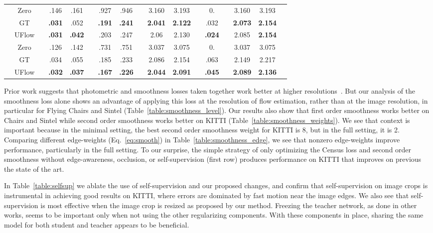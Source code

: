 \documentclass[runningheads]{llncs}
\begin{document}
\begin{wraptable}{r}{0.45\columnwidth}
{\begin{tabular}{lcccccccccccccccc}
    \midrule
    \parbox[t]{2mm}{}
    & Zero && .146 & .161 && .927 & .946 && 3.160 & 3.193 && 0. && 3.160 & 3.193 \\
    & GT && \textbf{.031} & .052 && \textbf{.191} & \textbf{.241} && \textbf{2.041} & \textbf{2.122} && .032 && \textbf{2.073} & \textbf{2.154} \\
    & UFlow && \textbf{.031} & \textbf{.042} && .203 & .247 && 2.06 & 2.130 && \textbf{.024} && 2.085 & \textbf{2.154} \\
    \midrule
    \parbox[t]{2mm}{}
    & Zero && .126 & .142 && .731 & .751 && 3.037 & 3.075 && 0. && 3.037 & 3.075 \\
    & GT && .034 & .055 && .185 & .233 && 2.086 & 2.154 && .063 && 2.149 & 2.217 \\
    & UFlow && \textbf{.032} & \textbf{.037} && \textbf{.167} & \textbf{.226} && \textbf{2.044} & \textbf{2.091} && \textbf{.045} && \textbf{2.089} & \textbf{2.136} \\
    \bottomrule
    \end{tabular}}
    \vspace{-0.2cm}
\end{wraptable}

 Prior work suggests that photometric and smoothness losses taken together work better at higher resolutions~\cite{godard2019digging}. But our analysis of the smoothness loss alone shows an advantage of applying this loss at the resolution of flow estimation, rather than at the image resolution, in particular for Flying Chairs and Sintel (Table~\ref{table:smoothness_level}). Our results also show that first order smoothness works better on Chairs and Sintel while second order smoothness works better on KITTI (Table~\ref{table:smoothness_weights}). We see that context is important because in the minimal setting, the best second order smoothness weight for KITTI is 8, but in the full setting, it is 2. Comparing different edge-weights  (Eq.~\ref{eq:smooth}) in Table~\ref{table:smoothness_edge}, we see that nonzero edge-weights improve performance, particularly in the full setting. To our surprise, the simple strategy of only optimizing the Census loss and second order smoothness without edge-awareness, occlusion, or self-supervision (first row) produces performance on KITTI that improves on previous the state of the art.

 In Table~\ref{table:selfsup} we ablate the use of self-supervision and our proposed changes, and confirm that self-supervision on image crops is instrumental in achieving good results on KITTI, where errors are dominated by fast motion near the image edges. We also see that self-supervision is most effective when the image crop is resized as proposed by our method. Freezing the teacher network, as done in other works, seems to be important only when not using the other regularizing components. With these components in place, sharing the same model for both student and teacher appears to be beneficial.
\end{document}
